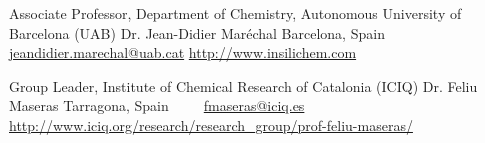 


\begin{cventries}

    \cventry
        {Associate Professor, Department of Chemistry, Autonomous University of Barcelona (UAB)}
        {Dr. Jean-Didier Maréchal}
        {Barcelona, Spain} %
        {~} %
        {~~ \footnotesize{%
            \href{mailto:jeandidier.marechal@uab.cat}{\faEnvelope\acvHeaderIconSep jeandidier.marechal@uab.cat}\acvHeaderSocialSep%
            \href{http://www.insilichem.com}{\faGlobe\acvHeaderIconSep http://www.insilichem.com}%
        }}

    \cventry
        {Group Leader, Institute of Chemical Research of Catalonia (ICIQ)}
        {Dr. Feliu Maseras}
        {Tarragona, Spain} %
        {~} %
        {~~ \footnotesize{%
            \href{mailto:fmaseras@iciq.es}{\faEnvelope\acvHeaderIconSep fmaseras@iciq.es}\acvHeaderSocialSep%
            \href{http://www.iciq.org/research/research_group/prof-feliu-maseras/}{\faGlobe\acvHeaderIconSep http://www.iciq.org/research/research\_group/prof-feliu-maseras/}
        }}

\end{cventries}